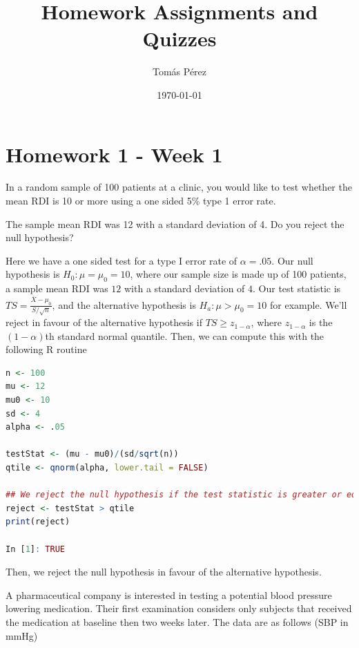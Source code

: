 \documentclass{homework}
\author{Tomás Pérez}
\date{\today}
\title{Homework Assignments and Quizzes}
\begin{document}
 \maketitle

\section{Homework 1 - Week 1}
\begin{tcolorbox}[title=Question 1]
In a  random sample of 100 patients at a clinic, you would like to test whether the mean RDI is 10 or more using a one sided 5\% type 1 error rate.

The sample mean RDI was 12 with a standard deviation of 4. Do you reject the null hypothesis?
\end{tcolorbox}

Here we have a one sided test for a type I error rate of $\alpha = .05$. Our null hypothesis is $H_0: \mu = \mu_0 = 10$, where our sample size is made up of 100 patients, a sample mean RDI was $12$ with a standard deviation of $4$. Our test statistic is $TS = \frac{\bar{X}-\mu_0}{S/\sqrt{n}}$, and the alternative hypothesis is $H_a : \mu > \mu_0 = 10$ for example. We'll reject in favour of the alternative hypothesis if $TS \geq z_{1-\alpha}$, where $z_{1-\alpha}$ is the $(1-\alpha)$th standard normal quantile. Then, we can compute this with the following R routine

\begin{lstlisting}[language=R]
n <- 100
mu <- 12
mu0 <- 10 
sd <- 4
alpha <- .05

testStat <- (mu - mu0)/(sd/sqrt(n))
qtile <- qnorm(alpha, lower.tail = FALSE)

## We reject the null hypothesis if the test statistic is greater or equal than the quantile
reject <- testStat > qtile 
print(reject)

In [1]: TRUE
\end{lstlisting}

Then, we reject the null hypothesis in favour of the alternative hypothesis. \\

\begin{tcolorbox}[title=Question 2]
A pharmaceutical company is interested in testing a potential blood pressure lowering medication. Their first examination considers only subjects that received the medication at baseline then two weeks later. The data are as follows (SBP in mmHg)
\end{tcolorbox}
\end{document}
